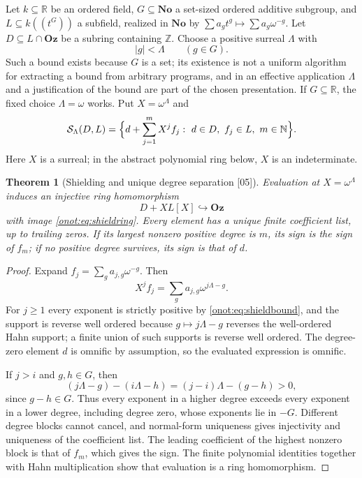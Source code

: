 \documentclass[11pt,oneside]{article}
\numberwithin{equation}{section}
\newtheorem{theorem}{Theorem}[section]
\theoremstyle{definition}
\theoremstyle{remark}
\newcommand{\No}{\mathbf{No}}
\newcommand{\Oz}{\mathbf{Oz}}
\newcommand{\N}{\mathbb N}
\newcommand{\Z}{\mathbb Z}
\newcommand{\R}{\mathbb R}
\newcommand{\src}[1]{\textup{\textsf{\small[#1]}}}
\begin{document}
Let $k\subseteq\R$ be an ordered field, $G\subseteq\No$ a set-sized ordered
additive subgroup, and $L\subseteq k((t^G))$ a subfield, realized in $\No$ by
$\sum a_gt^g\mapsto\sum a_g\omega^{-g}$. Let $D\subseteq L\cap\Oz$ be a subring
containing $\Z$. Choose a positive surreal $\Lambda$ with
\begin{equation}\label{onot:eq:shieldbound}
 |g|<\Lambda\qquad(g\in G).
\end{equation}
Such a bound exists because $G$ is a set; its existence is not a uniform
algorithm for extracting a bound from arbitrary programs, and in an effective
application $\Lambda$ and a justification of the bound are part of the chosen
presentation. If $G\subseteq\R$, the fixed choice $\Lambda=\omega$ works. Put
$X=\omega^\Lambda$ and
\begin{equation}\label{onot:eq:shieldring}
 \mathcal S_\Lambda(D,L)=\Bigl\{d+\sum_{j=1}^mX^jf_j:\ d\in D,\ f_j\in L,\ m\in\N\Bigr\}.
\end{equation}
Here $X$ is a surreal; in the abstract polynomial ring below, $X$ is an
indeterminate.

\begin{theorem}[Shielding and unique degree separation \src{05}]\label{onot:thm:shield}
Evaluation at $X=\omega^\Lambda$ induces an injective ring homomorphism
\[
 D+XL[X]\hookrightarrow\Oz
\]
with image \eqref{onot:eq:shieldring}. Every element has a unique finite
coefficient list, up to trailing zeros. If its largest nonzero positive degree
is $m$, its sign is the sign of $f_m$; if no positive degree survives, its sign
is that of $d$.
\end{theorem}
\begin{proof}
Expand $f_j=\sum_ga_{j,g}\omega^{-g}$. Then
\begin{equation}\label{onot:eq:shieldexpand}
 X^jf_j=\sum_ga_{j,g}\omega^{j\Lambda-g}.
\end{equation}
For $j\ge1$ every exponent is strictly positive by \eqref{onot:eq:shieldbound},
and the support is reverse well ordered because $g\mapsto j\Lambda-g$ reverses
the well-ordered Hahn support; a finite union of such supports is reverse well
ordered. The degree-zero element $d$ is omnific by assumption, so the evaluated
expression is omnific.

If $j>i$ and $g,h\in G$, then
\[
 (j\Lambda-g)-(i\Lambda-h)=(j-i)\Lambda-(g-h)>0,
\]
since $g-h\in G$. Thus every exponent in a higher degree exceeds every exponent in
a lower degree, including degree zero, whose exponents lie in $-G$. Different
degree blocks cannot cancel, and normal-form uniqueness gives injectivity and
uniqueness of the coefficient list. The leading coefficient of the highest
nonzero block is that of $f_m$, which gives the sign. The finite polynomial
identities together with Hahn multiplication show that evaluation is a ring
homomorphism.
\end{proof}
\end{document}
